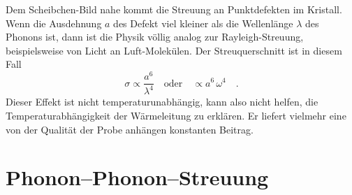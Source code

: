 Dem Scheibchen-Bild nahe kommt die Streuung an Punktdefekten im Kristall. Wenn die Ausdehnung $a$ des Defekt viel kleiner als die Wellenlänge $\lambda$ des Phonons ist, dann ist die Physik völlig analog zur Rayleigh-Streuung, beispielsweise von Licht an Luft-Molekülen. Der Streuquerschnitt ist in diesem Fall
\begin{equation}
    \sigma \propto \frac{a^6}{\lambda^4} \quad \text{oder} \quad \propto a^6 \, \omega^4 \quad .
\end{equation}
Dieser Effekt ist nicht temperaturunabhängig, kann also nicht helfen, die Temperaturabhängigkeit der Wärmeleitung zu erklären. Er liefert vielmehr eine von der Qualität der Probe anhängen konstanten Beitrag.



\section{Phonon--Phonon--Streuung}



